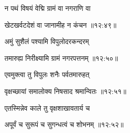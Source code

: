 {\devanagarifont न पथं विषयं वेद्मि ग्रामं वा नगराणि वा \thinspace{\dandab} \dontdisplaylinenum }%


{\devanagarifont खेटखर्वटदेशं वा जानामीह न कंचन {॥१२:४९॥} \veg\dontdisplaylinenum }%

{\devanagarifont अमुं सुशैलं पश्यामि विपुलोदरकन्दरम् \thinspace{\dandab} \dontdisplaylinenum }%


{\devanagarifont तमारुह्य निरीक्ष्यामि ग्रामं नगरपत्तनम् {॥१२:५०॥} \veg\dontdisplaylinenum }%

{\devanagarifont एवमुक्त्वा तु विपुलः शनैः पर्वतमारुहत् \thinspace{\dandab} \dontdisplaylinenum }%


{\devanagarifont वृक्षच्छायां समालोक्य निषसाद श्रमान्वितः {॥१२:५१॥} \veg\dontdisplaylinenum }%

{\devanagarifont एतस्मिन्नेव काले तु वृक्षशाखावतार्य च \thinspace{\dandab} \dontdisplaylinenum }%


{\devanagarifont अपूर्वं च सुरूपं च सुगन्धत्वं च शोभनम् {॥१२:५२॥} \veg\dontdisplaylinenum }%

